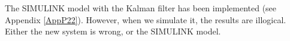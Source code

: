The SIMULINK model with the Kalman filter has been implemented (see Appendix \ref{AppP22}). However, when we simulate it, the results are illogical. Either the new system is wrong, or the SIMULINK model. 
